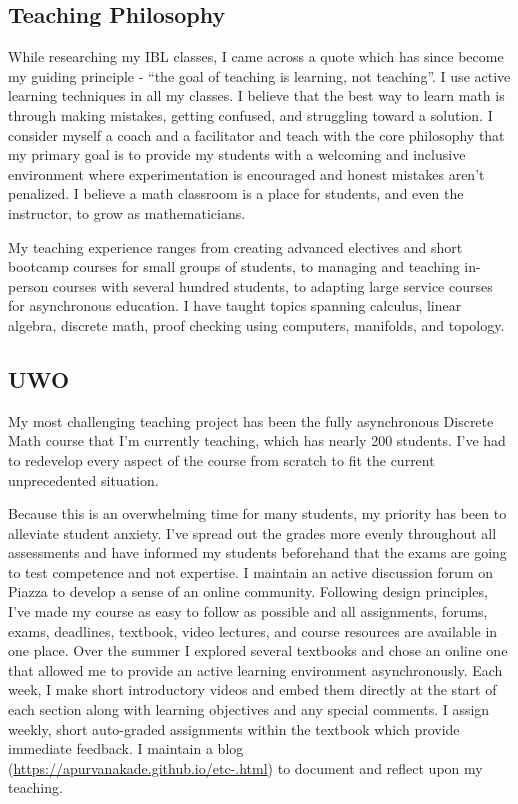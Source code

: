 \subsection*{Teaching Philosophy}
  While researching my IBL classes, I came across a quote which has since become my guiding principle - ``the goal of teaching is learning, not teaching''.
  I use active learning techniques in all my classes. I believe that the best way to learn math is through making mistakes, getting confused, and struggling toward a solution. I consider myself a coach and a facilitator and teach with the core philosophy that my primary goal is to provide my students with a welcoming and inclusive environment where experimentation is encouraged and honest mistakes aren’t penalized. I believe a math classroom is a place for students, and even the instructor, to grow as mathematicians.

  My teaching experience ranges from creating advanced electives and short bootcamp courses for small groups of students, to managing and teaching in-person courses with several hundred students, to adapting large service courses for asynchronous education.  I have taught topics spanning calculus, linear algebra, discrete math, proof checking using computers, manifolds, and topology.

\subsection*{UWO}
  My most challenging teaching project has been the fully asynchronous Discrete Math course that I'm currently teaching, which has nearly 200 students. 
  I've had to redevelop every aspect of the course from scratch to fit the current unprecedented situation.

  Because this is an overwhelming time for many students, my priority has been to alleviate student anxiety. 
  I've spread out the grades more evenly throughout all assessments and have informed my students beforehand that the exams are going to test competence and not expertise.
  I maintain an active discussion forum on Piazza to develop a sense of an online community.
  Following design principles, I've made my course as easy to follow as possible and all assignments, forums, exams, deadlines, textbook, video lectures, and course resources are available in one place.
  Over the summer I explored several textbooks and chose an online one that allowed me to provide an active learning environment asynchronously.
  Each week, I make short introductory videos and embed them directly at the start of each section along with learning objectives and any special comments.
  I assign weekly, short auto-graded assignments within the textbook which provide immediate feedback.
  I maintain a blog (\url{https://apurvanakade.github.io/etc-.html}) to document and reflect upon my teaching.

